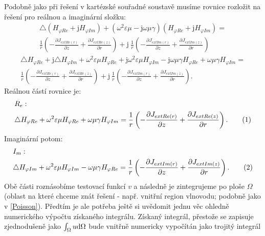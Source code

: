 \documentclass[12pt,a4paper,oneside]{article}
\numberwithin{equation}{section} %
\numberwithin{figure}{section} %
\numberwithin{table}{section} %
\newcommand{\mj}{\mathrm{j}} %
\newcommand\numberthis{\addtocounter{equation}{1}\tag{\theequation}}
\begin{document}
Podobně jako při řešení v kartézské souřadné soustavě musíme rovnice rozložit na řešení pro reálnou a imaginární složku:
\begin{equation}
\begin{split}
\triangle (H _{\varphi Re} + \mj H _{\varphi Im}) + (\omega ^2 \varepsilon \mu - \mj \omega \mu \gamma) (H _{\varphi Re} + \mj H _{\varphi Im}) =\\ 
\frac{1}{r} \left( - \frac{\partial J _{extRe(r)}}{\partial z} + \frac{\partial J _{extRe(z)}}{\partial r} \right) + \mj ~ \frac{1}{r} \left( - \frac{\partial J _{extIm(r)}}{\partial z} + \frac{\partial J _{extIm(z)}}{\partial r} \right)
\end{split}
\end{equation}
\begin{equation}
\begin{split}
\triangle H _{\varphi Re} + \mj \triangle H _{\varphi Im} + \omega ^2 \varepsilon \mu H_ {\varphi Re} + \mj \omega ^2 \varepsilon \mu H _{\varphi Im} - \mj \omega \mu \gamma H _{\varphi Re} + \omega \mu \gamma H _{\varphi Im} =\\
\frac{1}{r} \left( - \frac{\partial J _{extRe(r)}}{\partial z} + \frac{\partial J _{extRe(z)}}{\partial r} \right) + \mj ~ \frac{1}{r} \left( - \frac{\partial J _{extIm(r)}}{\partial z} + \frac{\partial J _{extIm(z)}}{\partial r} \right) .
\end{split}
\end{equation}
Reálnou částí rovnice je:
\begin{align*}
&R_{e}:
\\
&\triangle H_ {\varphi Re} + \omega ^2 \varepsilon \mu H_ {\varphi Re} + \omega \mu \gamma H _{\varphi Im} = \frac{1}{r} \left( - \frac{\partial J _{extRe(r)}}{\partial z} + \frac{\partial J _{extRe(z)}}{\partial r} \right) .
\numberthis
\end{align*}
Imaginární potom:
\begin{align*}
&I_{m}:
\\
&\triangle H _{\varphi Im} + \omega ^2 \varepsilon \mu H _{\varphi Im} - \omega \mu \gamma H _{\varphi Re} = \frac{1}{r} \left( - \frac{\partial J _{extIm(r)}}{\partial z} + \frac{\partial J _{extIm(z)}}{\partial r} \right) .
\numberthis
\end{align*}
Obě části roznásobíme testovací funkcí $v$ a následně je  zintegrujeme po ploše $\Omega$ (oblast na které chceme znát řešení - např. vnitřní region vlnovodu; podobně jako v \ref{Poisson}). Předtím je ale potřeba ještě si uvědomit jednu věc ohledně numerického výpočtu získaného integrálu. Získaný integrál, přestože se zapisuje zjednodušeně jako $\int _{\Omega} u \mathrm{d} \Omega$ bude vnitřně numericky vypočítán jako trojitý integrál 
\end{document}
